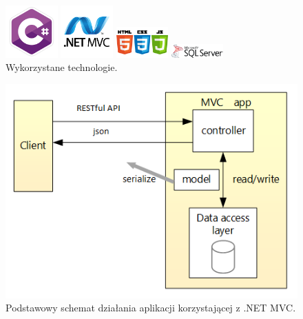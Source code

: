 \documentclass{article}
\begin{document}
\begin{figure}
\centering
		\begin{minipage}{2cm}
			\includegraphics[width=2cm]{c_hasztag.png}
		\end{minipage}
		\begin{minipage}{2cm}
			\includegraphics[width=2cm]{asp_net-MVC.png}
		\end{minipage}
		\begin{minipage}{2cm}
			\includegraphics[width=2cm]{html.png}
		\end{minipage}
		\begin{minipage}{2cm}
			\includegraphics[width=2cm]{sql.png}
		\end{minipage}
	\caption{Wykorzystane technologie.}
	\label{fig:technologie}
\end{figure}

\begin{figure}
\centering
	\includegraphics{mvc.png}
	\caption{Podstawowy schemat działania aplikacji korzystającej z .NET MVC.}
\end{figure}
\end{document}
